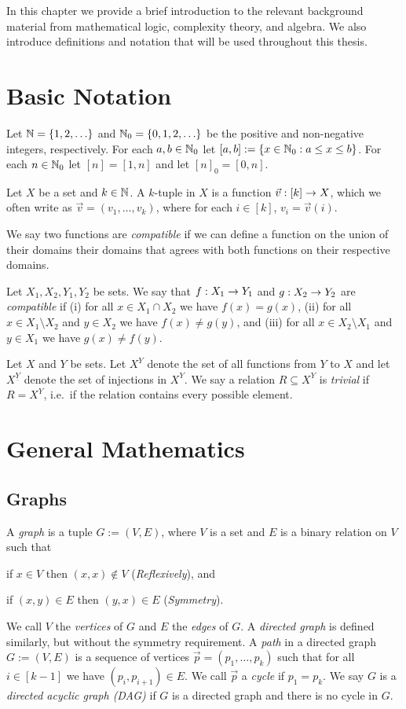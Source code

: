 \documentclass[../main/thesis.tex]{subfiles}
\begin{document}
In this chapter we provide a brief introduction to the relevant background
material from mathematical logic, complexity theory, and algebra. We also
introduce definitions and notation that will be used throughout this thesis.

\section{Basic Notation}
Let $\mathbb{N} = \{1, 2, \ldots\}$ and $\mathbb{N}_0 = \{0, 1, 2, \ldots\}$ be the
positive and non-negative integers, respectively. For each $a, b \in \mathbb{N}_0$
let $[a, b] := \{x \in \mathbb{N}_0 : a \leq x \leq b\}$. For each $n \in \mathbb{N}_0$
let $[n] = [1, n]$ and let $[n]_0 = [0, n]$.

Let $X$ be a set and $k \in \mathbb{N}$. A $k$-tuple in $X$ is a function $\vec{v} :
[k] \rightarrow X$, which we often write as $\vec{v} = (v_1, \ldots, v_k)$, where for
each $i \in [k]$, $v_i = \vec{v}(i)$.

We say two functions are \emph{compatible} if we can define a function on the
union of their domains their domains that agrees with both functions on their
respective domains.

\begin{definition}
  Let $X_1, X_2, Y_1, Y_2$ be sets. We say that $f: X_1 \rightarrow Y_1$ and $g : X_2
  \rightarrow Y_2$ are \emph{compatible} if (i) for all $x \in X_1 \cap X_2$ we have
  $f(x) = g(x)$, (ii) for all $x \in X_1 \setminus X_2$ and $y \in X_2$ we have
  $f(x) \neq g(y)$, and (iii) for all $x \in X_2 \setminus X_1$ and $y \in X_1$
  we have $g(x) \neq f(y)$.
\end{definition}

Let $X$ and $Y$ be sets. Let $X^Y$ denote the set of all functions from $Y$ to
$X$ and let $X^{\underline{Y}}$ denote the set of injections in $X^Y$. We say a
relation $R \subseteq X^Y$ is \emph{trivial} if $R = X^Y$, i.e.\ if the relation
contains every possible element.

\section{General Mathematics}
\subsection{Graphs}
A \emph{graph} is a tuple $G := (V, E)$, where $V$ is a set and $E$ is a binary
relation on $V$ such that
\begin{myenum}
\item if $x \in V$ then $(x, x) \not\in V$ (\emph{Reflexively}), and
\item if $(x, y) \in E$ then $(y, x) \in E$ (\emph{Symmetry}).
\end{myenum}
We call $V$ the \emph{vertices} of $G$ and $E$ the \emph{edges} of $G$. A
\emph{directed graph} is defined similarly, but without the symmetry
requirement. A \emph{path} in a directed graph $G := (V, E)$ is a sequence of
vertices $\vec{p} = (p_1, \ldots, p_k)$ such that for all $i \in [k -1]$ we have
$(p_i, p_{i+1}) \in E$. We call $\vec{p}$ a \emph{cycle} if $p_1 = p_k$. We say
$G$ is a \emph{directed acyclic graph (DAG)} if $G$ is a directed graph and
there is no cycle in $G$.
\end{document}

